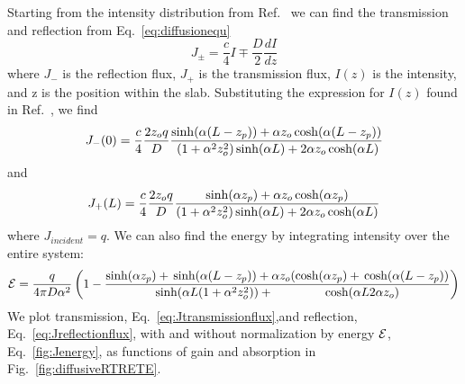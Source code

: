 Starting from the intensity distribution from Ref.~\cite{2004_Yamilov_intensity} we can find the transmission and reflection from Eq.~\ref{eq:diffusionequ}
\begin{equation}
J _{\pm} = \frac{c}{4} I \mp \frac{D}{2} \frac{dI}{dz}
\label{eq:diffusionequ}
\end{equation}
where $ J _- $ is the reflection flux, $ J _+ $ is the transmission flux, $I(z)$ is the intensity, and z is the position within the slab. Substituting the expression for $I(z)$ found in Ref.~\cite{diffusint}, we find
\begin{equation}
J _- (0) = \frac{c}{4} \frac{2 z _o q}{D} \\
\frac{\sinh(\alpha  (L-z _p)) + \alpha z_o \cosh(\alpha (L-z _p))}{\\
(1+ \alpha ^2 z_o ^2) \sinh(\alpha L) + 2 \alpha z_o \cosh(\alpha L)}
\label{eq:Jreflectionflux}
\end{equation}
and
\begin{equation}
J _+ (L) = \frac{c}{4} \frac{2 z _o q}{D} \\
\frac{\sinh(\alpha z_p) + \alpha z _o \cosh(\alpha z_p)}{(1+\alpha^2 z_o^2) \sinh(\alpha L) + 2 \alpha z_o \cosh(\alpha L)}
\label{eq:Jtransmissionflux}
\end{equation}
where $ J _{incident} = q $. We can also find the energy by integrating intensity over the entire system:
\begin{equation}
{\cal E} = \frac{q}{4 \pi D \alpha ^2} \left(1-\frac{\sinh(\alpha z_p) + \\
\sinh(\alpha (L-z_p))+\alpha z_o (\cosh(\alpha z_p) + \\
\cosh(\alpha (L - z_p))}{\sinh(\alpha L (1+\alpha^2 z_o^2))+\\
\cosh(\alpha L 2 \alpha z_o)}\right)
\label{fig:Jenergy}
\end{equation}
We plot transmission, Eq.~\ref{eq:Jtransmissionflux},and reflection, Eq.~\ref{eq:Jreflectionflux}, with and without normalization by energy ${\cal E}$, Eq.~\ref{fig:Jenergy}, as functions of gain and absorption in Fig.~\ref{fig:diffusiveRTRETE}.  
